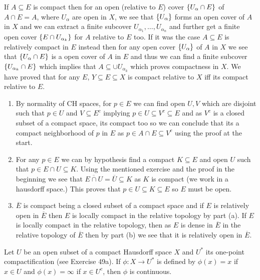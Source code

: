 \documentclass[12pt,a4paper]{article}
\begin{document}
\begin{solution}
    If $A \subseteq E$ is compact then for an open (relative to $E$) cover $ \qty{U_\alpha\cap E}$ of $A\cap E=A$, where $U_\alpha$ are open in $X$, we see that $\qty{U_\alpha}$ forms an open cover of $A$ in $X$ and we can extract a finite subcover $U_{\alpha_1},\ldots,U_{\alpha_n}$ and further get a finite open cover $ \qty{E\cap U_{\alpha_{k}}}$ for $A$ relative to $E$ too. 
    If it was the case $A \subseteq E$ is relatively compact in $E$ instead then for any open cover $ \qty{U_\alpha}$ of $A$ in $X$ we see that $ \qty{U_\alpha\cap E} $ is a open cover of $A$ in $E$ and thus we can find a finite subcover $ \qty{U_{\alpha_k}\cap E}$ which implies that $A \subseteq\cup U_{\alpha_k}$ which proves compactness in $X.$ 
    We have proved that for any $E$, $Y \subseteq E \subseteq X$ is compact relative to $X$ iff its compact relative to $E.$
\begin{enumerate}[label=\alph*.]
    \item 
    By normality of CH spaces, for $p\in E$ we can find open $U,V$ which are disjoint such that $p\in U$ and $V \subseteq E^c$ implying $p\in U \subseteq V^c \subseteq E$ and as $V^c$ is a closed subset of a compact space, its compact too so we can conclude that its a compact neighborhood of $p$ in $E$ as $p\in A\cap E \subseteq V^c$ using the proof at the start.
    \item
    For any $p\in E$ we can by hypothesis find a compact $K \subseteq E$ and open $U$ such that $p\in E\cap U \subseteq K$. 
    Using the mentioned exercise and the proof in the beginning we see that $ \overline{E\cap U}= \overline{U} \subseteq K$ as $K$ is compact (we work in a hausdorff space.) 
    This proves that $p\in U \subseteq K \subseteq E$ so $E$ must be open. 
    \item
    $ \overline{E}$ is compact being a closed subset of a compact space and if $E$ is relatively open in $ \overline{E}$ then $E$ is locally compact in the relative topology by part (a). 
    If $E$ is locally compact in the relative topology, then as $E$ is dense in $ \overline{E}$ in the relative topology of $ \overline{E}$ then by part (b) we see that it is relatively open in $ \overline{E}.$
\end{enumerate}
\end{solution}
\begin{problem}\label{prob:4-50}
Let $U$ be an open subset of a compact Hausdorff space $X$ and $U^*$ its one-point compactification (see Exercise 49a). If $\phi : X \to U^*$ is defined by $\phi(x) = x$ if $x \in U$ and $\phi(x) = \infty$ if $x \in U^c$, then $\phi$ is continuous.
\end{problem}
\end{document}
